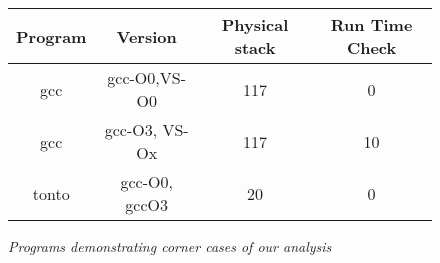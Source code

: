 
\begin{figure}[t]
{
\centering
{
\begin{scriptsize}
\begin{tabular}{|c|c|c|c|} %
\hline
\textbf{Program}&{\textbf{Version}}&{\textbf{Physical stack}}&{\textbf{Run Time Check}}\\ \hline
gcc&gcc-O0,VS-O0&117&0\\\hline
gcc&gcc-O3, VS-Ox&117&10\\	\hline
tonto&gcc-O0, gccO3&20&0\\	\hline
\end{tabular}
\caption {\scriptsize{\textit{Programs demonstrating corner cases of our analysis }}}
\label{fig:resultsCornerCases}
\end{scriptsize}
\vspace{-4ex}
}
}
\end{figure}
